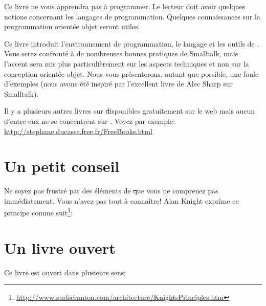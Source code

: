 \documentclass[a4paper,10pt,twoside]{book}
\begin{document}
Ce livre ne vous apprendra pas à programmer. Le lecteur doit avoir quelques 
notions concernant les langages de programmation. Quelques connaissances 
sur la programmation orientée objet seront utiles.

Ce livre introduit l'environnement de programmation, le langage et
les outils de \pharo. Vous serez confronté à de nombreuses bonnes
pratiques de Smalltalk, mais l'accent sera mis plus particulièrement
sur les aspects techniques et non sur la conception orientée
objet. Nous vous présenterons, autant que possible, une foule 
d'exemples (nous avons été inspiré par l'excellent livre de Alec
Sharp sur Smalltalk\cite{Shar97a}).

Il y a plusieurs autres livres sur \st disponibles gratuitement 
sur le web mais aucun d'entre eux ne se concentrent sur \pharo. 
Voyez par exemple: \url{http://stephane.ducasse.free.fr/FreeBooks.html}

\ifluluelse{}{\newpage} %
\section*{Un petit conseil}


Ne soyez pas frustré par des éléments de \st que vous ne comprenez pas immédiatement.
Vous n'avez pas tout à connaître!
Alan Knight exprime ce principe comme suit\footnote{\url{http://www.surfscranton.com/architecture/KnightsPrinciples.htm}}:
\important{{\bf Ne vous en préoccupez pas!}%
\footnote{Dans sa version originale: ``Try not to care''.}
Les développeurs \st débutants ont souvent beaucoup de
difficultés car ils pensent qu'il est nécessaire de connaître
tous les détails d'une chose avant de l'utiliser. Cela signifie
qu'il leur faut un moment avant de maîtriser un 
simple: \ct{Transcript show: 'Hello World'}. 
Une des grandes avancées de la programmation par objets est de 
pouvoir répondre à la question ``Comment ceci marche?'' avec  ``Je ne m'en préoccupe pas''.}

\section*{Un livre ouvert}

Ce livre est ouvert dans plusieurs sens:
\end{document}
